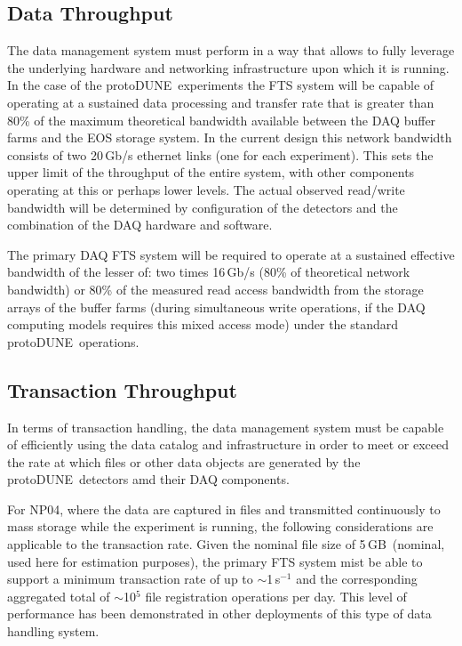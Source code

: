 \documentclass[pdftex,12pt,letter]{article}
\newcommand{\pd}{protoDUNE\ }
\newcommand{\filesize}{5\,GB\ }
\begin{document}
\subsection{Data Throughput}

The data management system must perform in a way that allows to fully leverage the underlying hardware and networking infrastructure
upon which  it is running.  In the case of the \pd experiments the FTS system will be capable of operating at a sustained data processing and transfer
rate that is greater than 80\% of the maximum theoretical bandwidth available between the DAQ buffer farms and the EOS storage system.
In the current design this network bandwidth consists of two 20\,Gb/s ethernet links (one for each experiment).
This sets the upper limit of the throughput of the entire system, with other components operating at this or perhaps lower levels.
The actual observed read/write bandwidth will be determined by configuration of the detectors and the combination
of the DAQ hardware and software.


  The primary DAQ FTS system will be required to operate at a sustained effective bandwidth
of the lesser of: two times 16\,Gb/s (80\% of theoretical network bandwidth) or 80\% of the measured read access bandwidth from the storage arrays
of the buffer farms
(during simultaneous write operations, if the DAQ computing models requires this mixed access mode) under the standard \pd operations.

\subsection{Transaction Throughput}

In terms of transaction handling,  the data management system must be capable of efficiently using the data
catalog and infrastructure in order to meet or exceed the rate at which files or other data
objects are generated by the \pd detectors amd their DAQ components.

For NP04, where the data are captured in files and transmitted continuously to mass storage while
the experiment is running, the following considerations are applicable to the transaction rate.
Given the nominal file size of \filesize (nominal, used here for estimation purposes), 
the primary FTS system mist be able to support a minimum transaction rate of up to  $\sim$1\,s$^{-1}$
and the corresponding aggregated total of $\sim$10$^5$ file registration operations per day.
This level of performance has been demonstrated in other deployments of this type of data
handling system.
\end{document}
